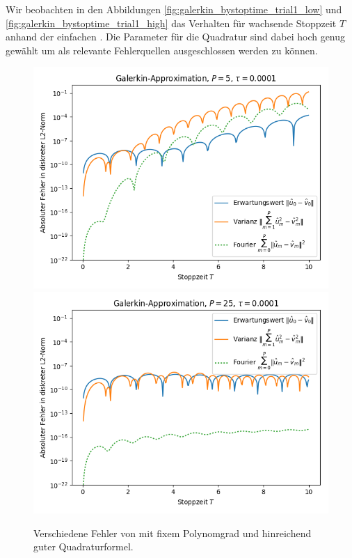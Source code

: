 Wir beobachten in den Abbildungen \ref{fig:galerkin_bystoptime_trial1_low} und \ref{fig:galerkin_bystoptime_trial1_high} das Verhalten für wachsende Stoppzeit $T$ anhand der einfachen . Die Parameter für die Quadratur sind dabei hoch genug gewählt um als relevante Fehlerquellen ausgeschlossen werden zu können. 
\begin{figure}[!htb]
  \includegraphics[width=\linewidth]{Figures/galerkin_bystoptime_trial1_fixeddegree5.png}
\endminipage
{}
  \includegraphics[width=\linewidth]{Figures/galerkin_bystoptime_trial1_fixeddegree25.png}
\endminipage
  \label{fig:galerkin_bystoptime_trial1}
  \caption{Verschiedene Fehler von  mit fixem Polynomgrad und hinreichend guter Quadraturformel.}
\end{figure}
